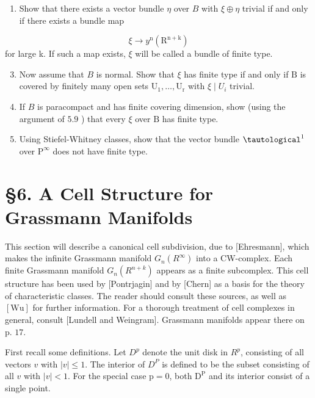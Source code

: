\documentclass[10pt]{article}
\begin{document}
\begin{enumerate}
  \item Show that there exists a vector bundle $\eta$ over $B$ with $\xi \oplus \eta$ trivial if and only if there exists a bundle map
\end{enumerate}
$$
\xi \rightarrow y^{\mathrm{n}}\left(\mathrm{R}^{\mathrm{n}+\mathrm{k}}\right)
$$
for large k. If such a map exists, $\xi$ will be called a bundle of finite type.

\begin{enumerate}
  \setcounter{enumi}{2}
  \item Now assume that $B$ is normal. Show that $\xi$ has finite type if and only if $\mathrm{B}$ is covered by finitely many open sets $\mathrm{U}_{1}, \ldots, \mathrm{U}_{\mathrm{r}}$ with $\xi \mid U_{i}$ trivial.

  \item If $B$ is paracompact and has finite covering dimension, show (using the argument of $5.9$ ) that every $\xi$ over $\mathrm{B}$ has finite type.

  \item Using Stiefel-Whitney classes, show that the vector bundle $\tautological^{1}$ over $\mathrm{P}^{\infty}$ does not have finite type.

\end{enumerate}
\section{§6. A Cell Structure for Grassmann Manifolds}
This section will describe a canonical cell subdivision, due to [Ehresmann], which makes the infinite Grassmann manifold $G_{n}\left(R^{\infty}\right)$ into a CW-complex. Each finite Grassmann manifold $G_{n}\left(R^{n+k}\right)$ appears as a finite subcomplex. This cell structure has been used by [Pontrjagin] and by [Chern] as a basis for the theory of characteristic classes. The reader should consult these sources, as well as $[\mathrm{Wu}]$ for further information. For a thorough treatment of cell complexes in general, consult [Lundell and Weingram]. Grassmann manifolds appear there on p. $17 .$

First recall some definitions. Let $D^{p}$ denote the unit disk in $R^{p}$, consisting of all vectors $v$ with $|v| \leq 1$. The interior of $D^{P}$ is defined to be the subset consisting of all $v$ with $|v|<1$. For the special case $\mathrm{p}=0$, both $\mathrm{D}^{\mathrm{P}}$ and its interior consist of a single point.
\end{document}

